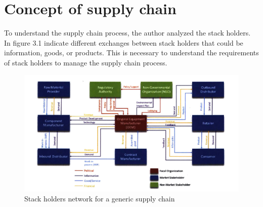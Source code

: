 \section{Concept of supply chain }
To understand the supply chain process, the author analyzed the stack holders. In figure 3.1 indicate different exchanges between stack holders that could be information, goods, or products. This is necessary to understand the requirements of stack holders to manage the supply chain process.
\\
\begin{center}
	
	\begin{figure}[htb!]
		
		\begin{minipage}{0.75\linewidth}
			
			\includegraphics[width=1.45\textwidth]{images/chap03_stackholders.png}
		\end{minipage}
		\caption{Stack holders network for a generic supply chain}
		
	\end{figure}
	
\end{center}

